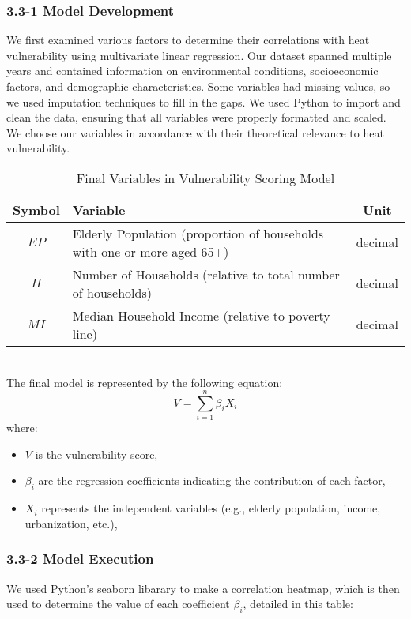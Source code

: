 \documentclass{article}
\begin{document}
\subsubsection*{3.3-1 Model Development}
We first examined various factors to determine their correlations with heat vulnerability using multivariate linear regression. Our dataset spanned multiple years and contained information on environmental conditions, socioeconomic factors, and demographic characteristics. Some variables had missing values, so we used imputation techniques to fill in the gaps. We used Python to import and clean the data, ensuring that all variables were properly formatted and scaled. We choose our variables in accordance with their theoretical relevance to heat vulnerability. 
\begin{table}[h]
    \centering
    \begin{tabular}{|c|l|c|}
        \hline
        \textbf{Symbol} & \textbf{Variable} & \textbf{Unit} \\ 
        \hline
        $EP$ & Elderly Population (proportion of households with one or more aged 65+) & decimal \\ 
        \hline
        $H$ & Number of Households (relative to total number of households) & decimal \\ 
        \hline
        $MI$ & Median Household Income (relative to poverty line) & decimal \\
        \hline
    \end{tabular}
    \caption{Final Variables in Vulnerability Scoring Model}
    \label{tab:variables}
\end{table}
\\
The final model is represented by the following equation:
\begin{equation}
V = \sum_{i=1}^{n} \beta_i X_i
\end{equation}
where:
\begin{itemize}
    \item \( V \) is the vulnerability score,
    \item \( \beta_i \) are the regression coefficients indicating the contribution of each factor,
    \item \( X_i \) represents the independent variables (e.g., elderly population, income, urbanization, etc.),
\end{itemize}

\subsubsection*{3.3-2 Model Execution}
We used Python's seaborn libarary to make a correlation heatmap, which is then used to determine the value of each coefficient $\beta_i$, detailed in this table:
\end{document}
